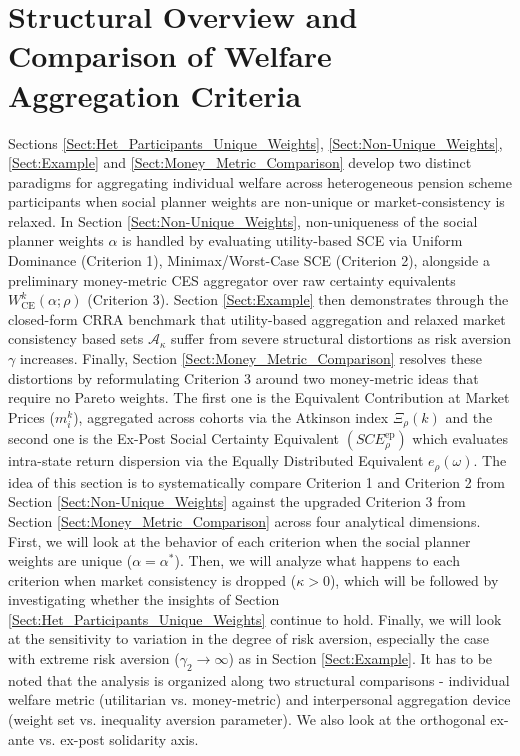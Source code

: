 \documentclass[11pt,a4paper]{article}
\theoremstyle{definition}
\theoremstyle{plain}
\theoremstyle{remark}
\newcommand{\1}{\mathbf{1}}
\begin{document}
\section{Structural Overview and Comparison of Welfare Aggregation Criteria}
\label{Sect:Structural_Synthesis}
Sections \ref{Sect:Het_Participants_Unique_Weights}, \ref{Sect:Non-Unique_Weights}, \ref{Sect:Example} and \ref{Sect:Money_Metric_Comparison} develop two distinct paradigms for aggregating individual welfare across heterogeneous pension scheme participants when social planner weights are non-unique or market-consistency is relaxed. In Section \ref{Sect:Non-Unique_Weights}, non-uniqueness of the social planner weights $\alpha$ is handled by evaluating utility-based SCE via Uniform Dominance (Criterion 1), Minimax/Worst-Case SCE (Criterion 2), alongside a preliminary money-metric CES aggregator over raw certainty equivalents $W_{\text{CE}}^k(\alpha; \rho)$ (Criterion 3). Section \ref{Sect:Example} then demonstrates through the closed-form CRRA benchmark that utility-based aggregation and relaxed market consistency based sets $\mathcal{A}_{\kappa}$ suffer from severe structural distortions as risk aversion $\gamma$ increases. Finally, Section \ref{Sect:Money_Metric_Comparison} resolves these distortions by reformulating Criterion 3 around two money-metric ideas that require no Pareto weights. The first one is the Equivalent Contribution at Market Prices ($m_i^k$), aggregated across cohorts via the Atkinson index $\Xi_\rho(k)$ and the second one is the Ex-Post Social Certainty Equivalent $(SCE_{\rho}^{\text{ep}})$ which evaluates intra-state return dispersion via the Equally Distributed Equivalent $e_\rho(\omega)$. The idea of this section is to systematically compare Criterion 1 and Criterion 2 from Section \ref{Sect:Non-Unique_Weights} against the upgraded Criterion 3 from Section \ref{Sect:Money_Metric_Comparison} across four analytical dimensions. First, we will look at the behavior of each criterion when the social planner weights are unique ($\alpha = \alpha^*$). Then, we will analyze what happens to each criterion when market consistency is dropped ($\kappa > 0$), which will be followed by investigating whether the insights of Section \ref{Sect:Het_Participants_Unique_Weights} continue to hold. Finally, we will look at the sensitivity to variation in the degree of risk aversion, especially the case with extreme risk aversion ($\gamma_2 \to \infty$) as in Section \ref{Sect:Example}. It has to be noted that the analysis is organized along two structural comparisons - individual welfare metric (utilitarian vs. money-metric) and interpersonal aggregation device (weight set vs. inequality aversion parameter). We also look at the orthogonal ex-ante vs. ex-post solidarity axis.
\end{document}
